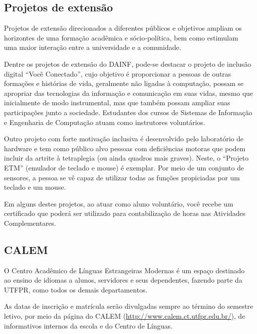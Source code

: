 \documentclass[a4paper,12pt,openany]{article}
\begin{document}
\subsection{Projetos de extensão}

Projetos de extensão direcionados a diferentes públicos e objetivos ampliam os horizontes de uma formação acadêmica e sócio-política, bem como estimulam uma maior interação entre a universidade e a comunidade. 

Dentre os projetos de extensão do DAINF, pode-se destacar o projeto de inclusão digital ``Você Conectado'', cujo objetivo é proporcionar a pessoas de outras formações e histórias de vida, geralmente não ligadas à computação, possam se apropriar das tecnologias da informação e comunicação em suas vidas, mesmo que inicialmente de modo instrumental, mas que também possam ampliar suas participações junto a sociedade. Estudantes dos cursos de Sistemas de Informação e Engenharia de Computação atuam como instrutores voluntários. 

Outro projeto com forte motivação inclusiva é desenvolvido pelo laboratório de hardware e tem como público alvo pessoas com deficiências motoras que podem incluir da artrite à tetraplegia (ou ainda quadros mais graves). Neste, o ``Projeto ETM'' (emulador de teclado e mouse) é exemplar. Por meio de um conjunto de sensores, a pessoa se vê capaz de utilizar todas as funções propiciadas por um teclado e um mouse. 

Em alguns destes projetos, ao atuar como aluno voluntário, você recebe um certificado que poderá ser utilizado para contabilização de horas nas Atividades Complementares. %

\subsection{CALEM}

O Centro Acadêmico de Línguas Estrangeiras Modernas é um espaço destinado ao ensino de idiomas a alunos, servidores e seus dependentes,  fazendo parte da UTFPR, como todos os demais departamentos.

As datas de inscrição e matrícula serão divulgadas sempre ao término do semestre letivo, por meio da página do CALEM (\url{http://www.calem.ct.utfpr.edu.br/}), de informativos internos da escola e do Centro de Línguas.
\end{document}
